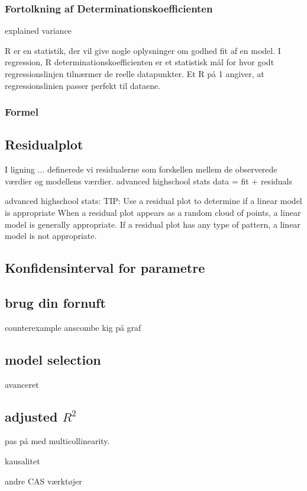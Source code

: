 \subsubsection{Fortolkning af Determinationskoefficienten}


explained variance

R er en statistik, der vil give nogle oplysninger om godhed fit af en model. I regression, R determinationskoefficienten er et statistisk mål for hvor godt regressionslinjen tilnærmer de reelle datapunkter. Et R på 1 angiver, at regressionslinien passer perfekt til dataene.

\subsubsection{Formel}


\subsection{Residualplot}
I ligning ... definerede vi residualerne som forskellen mellem de observerede værdier og modellens værdier.
advanced highschool stats
data = fit + residuals

advanced highschool stats:
TIP: Use a residual plot to determine if a linear model is appropriate
When a residual plot appears as a random cloud of points, a linear model is generally
appropriate. If a residual plot has any type of pattern, a linear model is not
appropriate.

\subsection{Konfidensinterval for parametre}




\subsection{brug din fornuft}
counterexample
anscombe
kig på graf

\subsection{model selection}
avanceret
\subsection{adjusted \(R^2\)}


pas på med multicollinearity.

kausalitet

andre CAS værktøjer
